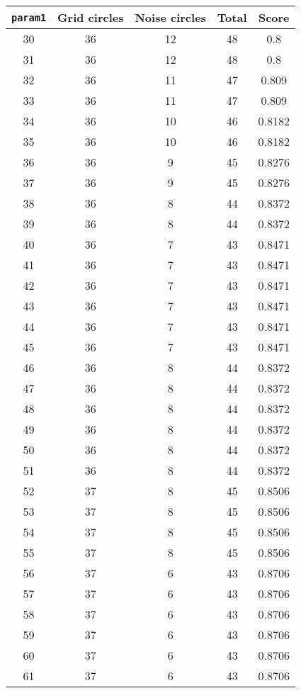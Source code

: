 \documentclass[letterpaper, 12pt]{article}
\begin{document}
\begin{longtable}{|c|c|c|c|c|}
\hline
\textbf{\texttt{param1}} & \textbf{Grid circles} & \textbf{Noise circles} & \textbf{Total} & \textbf{Score} \\
\hline
30 & 36 & 12 & 48 & 0.8 \\
\hline
31 & 36 & 12 & 48 & 0.8 \\
\hline
32 & 36 & 11 & 47 & 0.809 \\
\hline
33 & 36 & 11 & 47 & 0.809 \\
\hline
34 & 36 & 10 & 46 & 0.8182 \\
\hline
35 & 36 & 10 & 46 & 0.8182 \\
\hline
36 & 36 & 9 & 45 & 0.8276 \\
\hline
37 & 36 & 9 & 45 & 0.8276 \\
\hline
38 & 36 & 8 & 44 & 0.8372 \\
\hline
39 & 36 & 8 & 44 & 0.8372 \\
\hline
40 & 36 & 7 & 43 & 0.8471 \\
\hline
41 & 36 & 7 & 43 & 0.8471 \\
\hline
42 & 36 & 7 & 43 & 0.8471 \\
\hline
43 & 36 & 7 & 43 & 0.8471 \\
\hline
44 & 36 & 7 & 43 & 0.8471 \\
\hline
45 & 36 & 7 & 43 & 0.8471 \\
\hline
46 & 36 & 8 & 44 & 0.8372 \\
\hline
47 & 36 & 8 & 44 & 0.8372 \\
\hline
48 & 36 & 8 & 44 & 0.8372 \\
\hline
49 & 36 & 8 & 44 & 0.8372 \\
\hline
50 & 36 & 8 & 44 & 0.8372 \\
\hline
51 & 36 & 8 & 44 & 0.8372 \\
\hline
52 & 37 & 8 & 45 & 0.8506 \\
\hline
53 & 37 & 8 & 45 & 0.8506 \\
\hline
54 & 37 & 8 & 45 & 0.8506 \\
\hline
55 & 37 & 8 & 45 & 0.8506 \\
\hline
56 & 37 & 6 & 43 & 0.8706 \\
\hline
57 & 37 & 6 & 43 & 0.8706 \\
\hline
58 & 37 & 6 & 43 & 0.8706 \\
\hline
59 & 37 & 6 & 43 & 0.8706 \\
\hline
60 & 37 & 6 & 43 & 0.8706 \\
\hline
61 & 37 & 6 & 43 & 0.8706 \\

\end{longtable}
\end{document}
